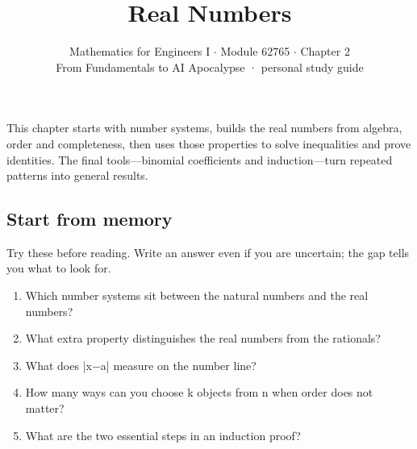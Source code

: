 \documentclass[11pt]{article}
\title{\sffamily\bfseries\color{FAUblue}Real Numbers}
\author{Mathematics for Engineers I \ensuremath{\cdot} Module 62765 \ensuremath{\cdot} Chapter 2\\[2pt]\small From Fundamentals to AI Apocalypse · personal study guide}
\date{}
\begin{document}
\maketitle
\begingroup\footnotesize\setlength{\parskip}{0pt}\tableofcontents\endgroup
\clearpage

{\large This chapter starts with number systems, builds the real numbers from algebra, order and completeness, then uses those properties to solve inequalities and prove identities. The final tools—binomial coefficients and induction—turn repeated patterns into general results.}


\begin{keepsection}
\section{Start from memory}

Try these before reading. Write an answer even if you are uncertain; the gap tells you what to look for.

\begin{enumerate}
\item Which number systems sit between the natural numbers and the real numbers?
\item What extra property distinguishes the real numbers from the rationals?
\item What does |x\ensuremath{-}a| measure on the number line?
\item How many ways can you choose k objects from n when order does not matter?
\item What are the two essential steps in an induction proof?
\end{enumerate}

\end{keepsection}
\end{document}
